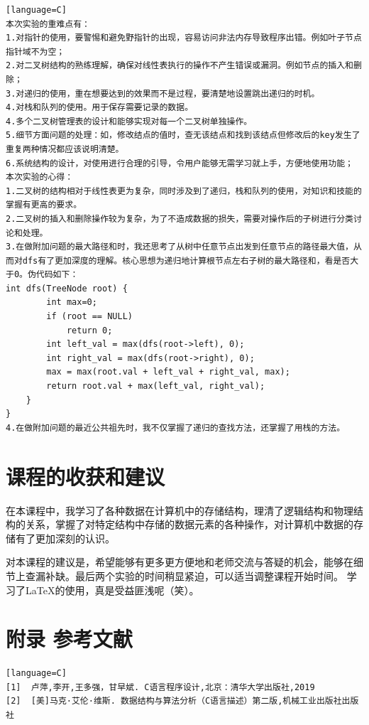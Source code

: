 \documentclass[supercite]{Experimental_Report}
\theoremstyle{definition}
\begin{document}
\begin{sloppypar}
\begin{lstlisting}[breaklines][language=C]
本次实验的重难点有：
1.对指针的使用，要警惕和避免野指针的出现，容易访问非法内存导致程序出错。例如叶子节点指针域不为空；
2.对二叉树结构的熟练理解，确保对线性表执行的操作不产生错误或漏洞。例如节点的插入和删除；
3.对递归的使用，重在想要达到的效果而不是过程，要清楚地设置跳出递归的时机。
4.对栈和队列的使用。用于保存需要记录的数据。
4.多个二叉树管理表的设计和能够实现对每一个二叉树单独操作。
5.细节方面问题的处理：如，修改结点的值时，查无该结点和找到该结点但修改后的key发生了重复两种情况都应该说明清楚。
6.系统结构的设计，对使用进行合理的引导，令用户能够无需学习就上手，方便地使用功能；
本次实验的心得：
1.二叉树的结构相对于线性表更为复杂，同时涉及到了递归，栈和队列的使用，对知识和技能的掌握有更高的要求。
2.二叉树的插入和删除操作较为复杂，为了不造成数据的损失，需要对操作后的子树进行分类讨论和处理。
3.在做附加问题的最大路径和时，我还思考了从树中任意节点出发到任意节点的路径最大值，从而对dfs有了更加深度的理解。核心思想为递归地计算根节点左右子树的最大路径和，看是否大于0。伪代码如下：
int dfs(TreeNode root) {
        int max=0;
        if (root == NULL)
            return 0;
        int left_val = max(dfs(root->left), 0);
        int right_val = max(dfs(root->right), 0);
        max = max(root.val + left_val + right_val, max);
        return root.val + max(left_val, right_val);
    }
}
4.在做附加问题的最近公共祖先时，我不仅掌握了递归的查找方法，还掌握了用栈的方法。

\end{lstlisting}

\section{课程的收获和建议}

在本课程中，我学习了各种数据在计算机中的存储结构，理清了逻辑结构和物理结构的关系，掌握了对特定结构中存储的数据元素的各种操作，对计算机中数据的存储有了更加深刻的认识。

对本课程的建议是，希望能够有更多更方便地和老师交流与答疑的机会，能够在细节上查漏补缺。最后两个实验的时间稍显紧迫，可以适当调整课程开始时间。
学习了LaTeX的使用，真是受益匪浅呢（笑）。
\appendix
\section{附录 参考文献}
\begin{lstlisting}[breaklines][language=C]
[1]  卢萍,李开,王多强，甘早斌. C语言程序设计,北京：清华大学出版社,2019
[2]  [美]马克·艾伦·维斯. 数据结构与算法分析（C语言描述）第二版,机械工业出版社出版社
\end{lstlisting}


\end{sloppypar}
\end{document}
